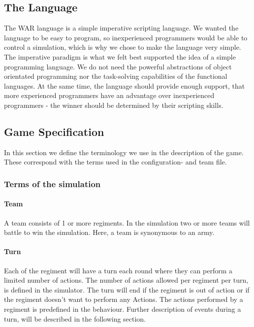	\subsection{The Language}
		The WAR language is a simple imperative scripting language. 
		We wanted the language to be easy to program, so inexperienced programmers would be able to control a simulation, which is why we chose to
		make the language very simple. The imperative paradigm is what we felt best supported the idea of a simple programming language. We do not need the
		powerful abstractions of object orientated programming nor the task-solving capabilities of the functional languages. At the same time, the language should provide enough support, that more experienced programmers have an advantage over inexperienced programmers - the winner should be determined by their scripting skills.
		
		 
	\subsection{Game Specification}
	In this section we define the terminology we use in the description of the game. \\
	These correspond with the terms used in the configuration- and team file.
	
		\subsubsection{Terms of the simulation}
		
		\paragraph{Team}		
		A team consists of 1 or more regiments. In the simulation two or more teams will battle to win the simulation. Here, a team is synonymous to an army.
		
		\paragraph{Turn}
		Each of the regiment will have a turn each round where they can perform a limited number of actions. The number of actions allowed per regiment per turn, is defined in the simulator.
		The turn will end if the regiment is out of action or if the regiment doesn't want to perform any Actions. 
		The actions performed by a regiment is predefined in the behaviour. 
		Further description of events during a turn, will be described in the following section.
		
